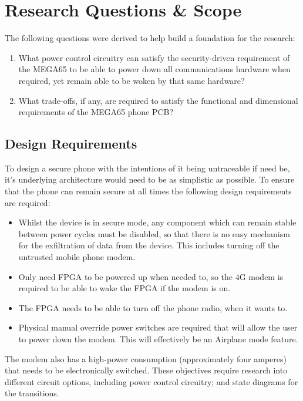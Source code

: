 
\section{Research Questions \& Scope}
The following questions were derived to help build a foundation for the research:
\begin{enumerate}
\item What power control circuitry can satisfy the security-driven requirement of the MEGA65 to be able to power down all communications hardware when required, yet remain able to be woken by that same hardware?
\item What trade-offs, if any, are required to satisfy the functional and dimensional requirements of the MEGA65 phone PCB?
\end{enumerate}

\subsection{Design Requirements}

To design a secure phone with the intentions of it being untraceable if need be, it’s underlying architecture would need to be as simplistic as possible. To ensure that the phone can remain secure at all times the following design requirements are required:
\begin{itemize}
\item Whilst the device is in secure mode, any component which can remain stable between power cycles must be disabled, so that there is no easy mechanism for the exfiltration of data from the device. This includes turning off the untrusted mobile phone modem. 
\item Only need FPGA to be powered up when needed to, so the 4G modem is required to be able to wake the FPGA if the modem is on.
\item The FPGA needs to be able to turn off the phone radio, when it wants to.
\item Physical manual override power switches are required that will allow the user to power down the modem. This will effectively be an Airplane mode feature. 
\end{itemize}
The modem also has a high-power consumption (approximately four amperes) that needs to be electronically switched. These objectives require research into different circuit options, including power control circuitry; and state diagrams for the transitions.

